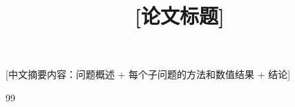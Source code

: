 \documentclass[withoutpreface,bwprint]{cumcmthesis}
\title{[论文标题]}
\makeatletter
\renewenvironment{abstract}{%
  \if@twocolumn\section*{\abstractname}%
  \else\begin{center}{\zihao{4}\bfseries \abstractname\vspace{-.5em}\vspace{\z@}}\end{center}\quotation
  \fi}{\if@twocolumn\else\endquotation\newpage\fi}
\makeatother
\begin{document}
\maketitle

\begin{abstract}

[中文摘要内容：问题概述 + 每个子问题的方法和数值结果 + 结论]

\keywords{[关键词1]\quad [关键词2]\quad [关键词3]}
\end{abstract}

\tableofcontents
\clearpage











\begin{thebibliography}{99}
\end{thebibliography}

\begin{appendices}

\end{appendices}
\end{document}
